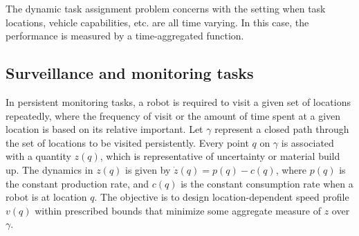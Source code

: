 The dynamic task assignment problem concerns with the setting when task locations, vehicle capabilities, etc. are all time varying. In this case, the performance is measured by a time-aggregated function.  

\subsection{Surveillance and monitoring tasks}
In persistent monitoring tasks, a robot is required to visit a given set of locations repeatedly, where the frequency of visit or the amount of time spent at a given location is based on its relative important. Let $\gamma$ represent a closed path through the set of locations to be visited persistently. Every point $q$ on $\gamma$ is associated with a quantity $z(q)$, which is representative of uncertainty or material build up. The dynamics in $z(q)$ is given by $\dot{z}(q)=p(q)-c(q)$, where $p(q)$ is the constant production rate, and $c(q)$ is the constant consumption rate when a robot is at location $q$. The objective is to design location-dependent speed profile $v(q)$ within prescribed bounds that minimize some aggregate measure of $z$ over $\gamma$.













